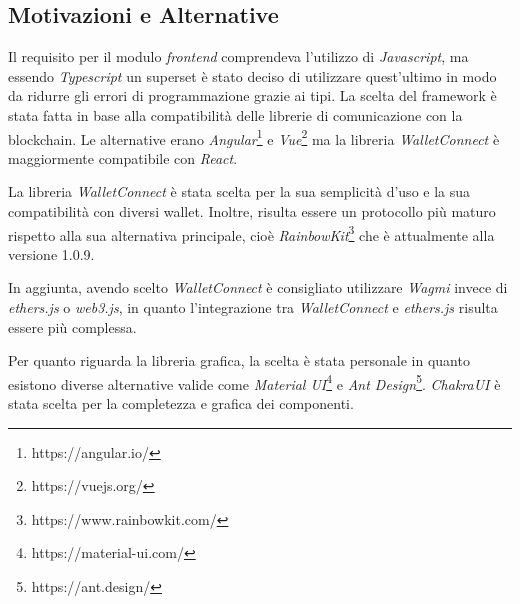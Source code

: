 \subsection{Motivazioni e Alternative}

Il requisito per il modulo \textit{frontend} comprendeva l'utilizzo di \textit{Javascript}, ma essendo \textit{Typescript} un superset è stato deciso di utilizzare quest'ultimo in modo da ridurre gli errori di programmazione grazie ai tipi. La scelta del framework è stata fatta in base alla compatibilità delle librerie di comunicazione con la blockchain. Le alternative erano \textit{Angular}\footnote{https://angular.io/} e \textit{Vue}\footnote{https://vuejs.org/} ma la libreria \textit{WalletConnect} è maggiormente compatibile con \textit{React}.
 
La libreria \textit{WalletConnect} è stata scelta per la sua semplicità d'uso e la sua compatibilità con diversi wallet. Inoltre, risulta essere un protocollo più maturo rispetto alla sua alternativa principale, cioè \textit{RainbowKit}\footnote{https://www.rainbowkit.com/} che è attualmente alla versione 1.0.9.

In aggiunta, avendo scelto \textit{WalletConnect} è consigliato utilizzare \textit{Wagmi} invece di \textit{ethers.js} o \textit{web3.js}, in quanto l'integrazione tra \textit{WalletConnect} e \textit{ethers.js} risulta essere più complessa.

Per quanto riguarda la libreria grafica, la scelta è stata personale in quanto esistono diverse alternative valide come \textit{Material UI}\footnote{https://material-ui.com/} e \textit{Ant Design}\footnote{https://ant.design/}. \textit{ChakraUI} è stata scelta per la completezza e grafica dei componenti.